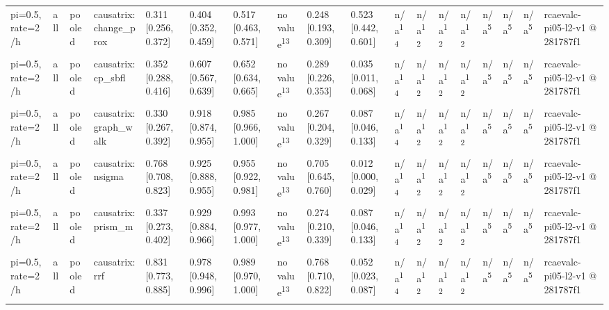 \begin{table}[t]
\begin{tabular}{llllllllllllllllll}
pi=0.5, rate=2/h & all & pooled & causatrix:change\_prox & 0.311 [0.256, 0.372] & 0.404 [0.352, 0.459] & 0.517 [0.463, 0.571] & no value\textsuperscript{13} & 0.248 [0.193, 0.309] & 0.523 [0.442, 0.601] & n/a\textsuperscript{14} & n/a\textsuperscript{12} & n/a\textsuperscript{12} & n/a\textsuperscript{12} & n/a\textsuperscript{5} & n/a\textsuperscript{5} & n/a\textsuperscript{5} & rcaevalc-pi05-l2-v1 @ 281787f1 \\
pi=0.5, rate=2/h & all & pooled & causatrix:cp\_sbfl & 0.352 [0.288, 0.416] & 0.607 [0.567, 0.639] & 0.652 [0.634, 0.665] & no value\textsuperscript{13} & 0.289 [0.226, 0.353] & 0.035 [0.011, 0.068] & n/a\textsuperscript{14} & n/a\textsuperscript{12} & n/a\textsuperscript{12} & n/a\textsuperscript{12} & n/a\textsuperscript{5} & n/a\textsuperscript{5} & n/a\textsuperscript{5} & rcaevalc-pi05-l2-v1 @ 281787f1 \\
pi=0.5, rate=2/h & all & pooled & causatrix:graph\_walk & 0.330 [0.267, 0.392] & 0.918 [0.874, 0.955] & 0.985 [0.966, 1.000] & no value\textsuperscript{13} & 0.267 [0.204, 0.329] & 0.087 [0.046, 0.133] & n/a\textsuperscript{14} & n/a\textsuperscript{12} & n/a\textsuperscript{12} & n/a\textsuperscript{12} & n/a\textsuperscript{5} & n/a\textsuperscript{5} & n/a\textsuperscript{5} & rcaevalc-pi05-l2-v1 @ 281787f1 \\
pi=0.5, rate=2/h & all & pooled & causatrix:nsigma & 0.768 [0.708, 0.823] & 0.925 [0.888, 0.955] & 0.955 [0.922, 0.981] & no value\textsuperscript{13} & 0.705 [0.645, 0.760] & 0.012 [0.000, 0.029] & n/a\textsuperscript{14} & n/a\textsuperscript{12} & n/a\textsuperscript{12} & n/a\textsuperscript{12} & n/a\textsuperscript{5} & n/a\textsuperscript{5} & n/a\textsuperscript{5} & rcaevalc-pi05-l2-v1 @ 281787f1 \\
pi=0.5, rate=2/h & all & pooled & causatrix:prism\_m & 0.337 [0.273, 0.402] & 0.929 [0.884, 0.966] & 0.993 [0.977, 1.000] & no value\textsuperscript{13} & 0.274 [0.210, 0.339] & 0.087 [0.046, 0.133] & n/a\textsuperscript{14} & n/a\textsuperscript{12} & n/a\textsuperscript{12} & n/a\textsuperscript{12} & n/a\textsuperscript{5} & n/a\textsuperscript{5} & n/a\textsuperscript{5} & rcaevalc-pi05-l2-v1 @ 281787f1 \\
pi=0.5, rate=2/h & all & pooled & causatrix:rrf & 0.831 [0.773, 0.885] & 0.978 [0.948, 0.996] & 0.989 [0.970, 1.000] & no value\textsuperscript{13} & 0.768 [0.710, 0.822] & 0.052 [0.023, 0.087] & n/a\textsuperscript{14} & n/a\textsuperscript{12} & n/a\textsuperscript{12} & n/a\textsuperscript{12} & n/a\textsuperscript{5} & n/a\textsuperscript{5} & n/a\textsuperscript{5} & rcaevalc-pi05-l2-v1 @ 281787f1 \\

\end{tabular}
\end{table}
